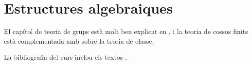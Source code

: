 \documentclass[../../main.tex]{subfiles}
\begin{document}
\part{Estructures algebraiques}



\printbibliography
El capítol de teoria de grups està molt ben explicat en \cite{NumerosGruposyAnillos}, i la teoria de cossos finits està complementada amb \cite{AntoineRosaCampsMoncasiIntroduccioAlgebraAbstracta} sobre la teoria de classe.

La bibliografia del curs inclou els textos \cite{NumerosGruposyAnillos, AntoineRosaCampsMoncasiIntroduccioAlgebraAbstracta, CedoAlgebraBasica, CohnBasicAlgebra, FelixConcepcionSebastianIntroduccionAlAlgebra, FraleighFirstCourseAbstractAlgebra, HungerfordAlgebra}.
\end{document}
